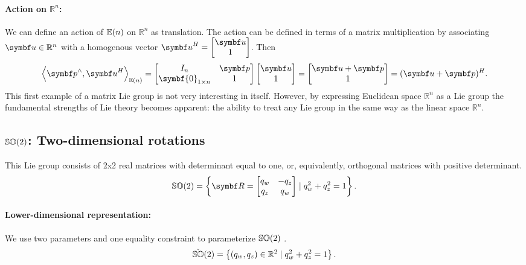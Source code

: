 \paragraph{Action on $\mathbb{R}^n$:} We can define an action of ${\mathbb{E}(n)}$ on $\mathbb{R}^n$ as translation. The action can be defined in terms of a matrix multiplication by associating $\bu \in \mathbb{R}^n$ with a homogenous vector ${\bu}^H = \begin{bmatrix}
    \bu \\ 1
  \end{bmatrix}$. Then
\begin{equation}
  \label{eq:en_action}
  \left \langle \bp^\wedge, {\bu^H }\right \rangle_{\En} = \begin{bmatrix}
    I_n & \bp \\ \symbf{0}_{1 \times n} & 1
  \end{bmatrix} \begin{bmatrix}
    \bu \\ 1
  \end{bmatrix} = \begin{bmatrix}
    \bu + \bp \\ 1
  \end{bmatrix} = (\bu + \bp)^H.
\end{equation}
This first example of a matrix Lie group is not very interesting in itself. However, by expressing Euclidean space $\mathbb{R}^n$ as a Lie group the fundamental strengths of Lie theory becomes apparent: the ability to treat any Lie group in the same way as the linear space $\mathbb{R}^n$.


\subsection{\texorpdfstring{${\mathbb{SO}(2)}$}{SO(2)}: Two-dimensional rotations}

This Lie group consists of 2x2 real matrices with determinant equal to one, or, equivalently, orthogonal matrices with positive determinant.
\begin{equation}
  \SOtwo = \left\{ \bR = \begin{bmatrix}
    q_w & -q_z \\ q_z & q_w
  \end{bmatrix} \mid q_w^2 + q_z^2 = 1 \right\}.
\end{equation}

\paragraph{Lower-dimensional representation:} We use two parameters and one equality constraint to parameterize ${\mathbb{SO}(2)}$ .
\begin{equation}
  \check{\mathbb{SO}}(2) = \left\{ (q_w, q_z) \in \mathbb{R}^2 \mid q_w^2 + q_z^2 = 1 \right\}.
\end{equation}

